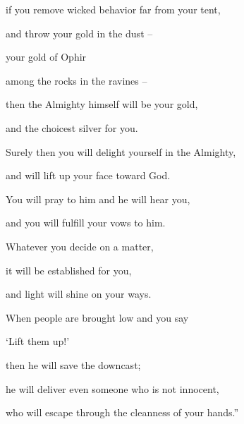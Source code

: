 {\par }{\Q if you remove wicked behavior
far
from your tent,
\par }{\Q {}and throw
your gold
in
the dust
–
\par }{\Q your gold
of Ophir
\par }{\Q among the rocks
in the ravines –
\par }{\Q {}then the Almighty
himself will be your gold,
\par }{\Q and the choicest
silver for you.
\par }{\Q {}Surely
then
you will delight
yourself in the Almighty,
\par }{\Q and will lift
up your face
toward
God.
\par }{\Q {}You will pray
to him and he will hear
you,
\par }{\Q and you will fulfill
your vows to him.
\par }{\Q {}Whatever
you decide on a matter,
\par }{\Q it will be established
for you,
\par }{\Q and light
will shine
on
your ways.
\par }{\Q {}When
people are brought low
and you say
\par }{\Q ‘Lift them up!’

\par }{\Q then he will save
the downcast;
\par }{\Q {}he will deliver
even someone
who is not innocent,
\par }{\Q who will escape
through the cleanness
of your hands.”


\par }

